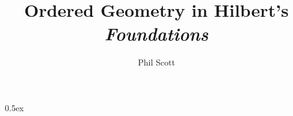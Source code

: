 \documentclass[phd,cisa]{infthesis}
\title{Ordered Geometry in Hilbert's \emph{Foundations}}
\author{Phil Scott}
\begin{document}
\begin{preliminary}

\maketitle


\standarddeclaration

\tableofcontents

\end{preliminary}

\parindent 0pt\parskip 0.5ex
























\appendix





\end{document}
